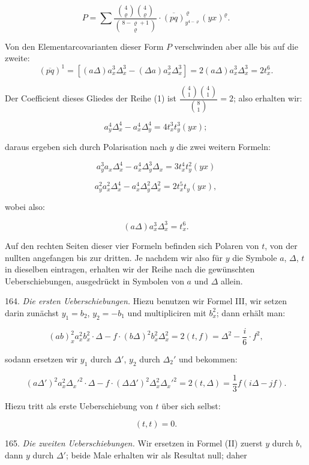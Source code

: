 \documentclass[11pt]{article}
\providecommand{\weberpage}[1]{}
\providecommand{\weq}[2]{\begin{equation}\tag{#1}#2\end{equation}}
\let\Delta\varDelta
\begin{document}
\weq{1}{P = \sum \frac{\binom{4}{\varrho}\binom{4}{\varrho}}{\binom{8-\varrho+1}{\varrho}} \cdot \overline{(pq)}^{\,\varrho}_{y^{4-\varrho}} (yx)^\varrho.}

Von den Elementarcovarianten dieser Form $P$ verschwinden aber alle bis auf die zweite:
\[
(\overline{pq})^1 = [(a\Delta)a_x^3 \Delta_x^3 - (\Delta a)a_x^3\Delta_x^3] = 2(a\Delta)a_x^3\Delta_x^3 = 2t_x^6.
\]

Der Coefficient dieses Gliedes der Reihe (1) ist $\dfrac{\binom{4}{1}\binom{4}{1}}{\binom{8}{1}} = 2$; also erhalten wir:

\weq{I}{a_y^4\Delta_x^4 - a_x^4\Delta_y^4 = 4t_x^3 t_y^3(yx);}

daraus ergeben sich durch Polarisation nach $y$ die zwei weitern Formeln:

\weq{II}{a_y^3 a_x \Delta_x^4 - a_x^4 \Delta_y^3\Delta_x = 3t_x^4 t_y^2(yx)}

\weq{III}{a_y^2 a_x^2\Delta_x^4 - a_x^4\Delta_y^2\Delta_x^2 = 2t_x^5 t_y(yx),}


\weberpage{184}

wobei also:

\weq{IV}{(a\Delta)a_x^3\Delta_x^3 = t_x^6.}

Auf den rechten Seiten dieser vier Formeln befinden sich Polaren von $t$, von der nullten angefangen bis zur dritten. Je nachdem wir also für $y$ die Symbole $a$, $\Delta$, $t$ in dieselben eintragen, erhalten wir der Reihe nach die gewünschten Ueberschiebungen, ausgedrückt in Symbolen von $a$ und $\Delta$ allein.

164. \textit{Die ersten Ueberschiebungen.} Hiezu benutzen wir Formel III, wir setzen darin zunächst $y_1 = b_2$, $y_2 = -b_1$ und multipliciren mit $b_x^2$; dann erhält man:

\weq{1}{(ab)_x^2 a_x^2 b_x^2 \cdot \Delta - f\cdot(b\Delta)^2 b_x^2\Delta_x^2 = 2(t,f) = \Delta^2 - \frac{i}{6}\cdot f^2,}

sodann ersetzen wir $y_1$ durch $\Delta'$, $y_2$ durch $\Delta_2'$ und bekommen:

\weq{2}{(a\Delta')^2 a_x^2 \Delta_x'^2 \cdot \Delta - f\cdot(\Delta\Delta')^2\Delta_x^2\Delta_x'^2 = 2(t,\Delta) = \frac{1}{3} f(i\Delta - jf).}

Hiezu tritt als erste Ueberschiebung von $t$ über sich selbst:

\weq{3}{(t,t) = 0.}

165. \textit{Die zweiten Ueberschiebungen.} Wir ersetzen in Formel (II) zuerst $y$ durch $b$, dann $y$ durch $\Delta'$; beide Male erhalten wir als Resultat null; daher
\end{document}
